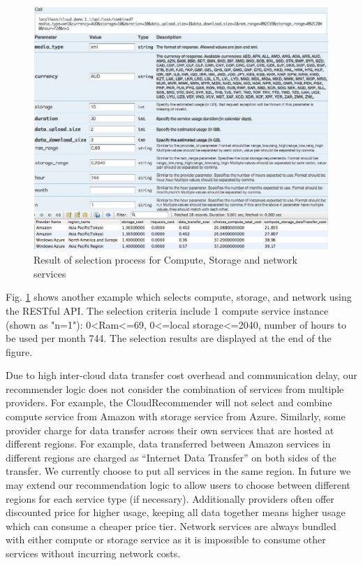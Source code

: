 \begin{figure}[!ht]
  \includegraphics[width=\textwidth,keepaspectratio]{Figures/system/CloudRecommender/ResultOfSelectionForComputeStorageNetwork.jpg}
  \caption{Result of selection process for Compute, Storage and network services}
  \label{fig:ResultOfSelectionForComputeStorageNetwork}
\end{figure}

Fig. \ref{fig:ResultOfSelectionForComputeStorageNetwork} shows another
example which selects compute, storage, and network using the RESTful API. The
selection criteria include 1 compute service instance (shown as "n=1"):
0<Ram<=69, 0<=local storage<=2040, number of hours to be used per month 744.
The selection results are displayed at the end of the figure.

Due to high inter-cloud data transfer cost overhead and communication delay, our
recommender logic does not consider the combination of services from multiple
providers. For example, the CloudRecommender will not select and combine compute
service from Amazon with storage service from Azure. 
Similarly, some provider charge for data transfer across their
own services that are hosted at different regions. For example, data transferred
between Amazon services in different regions are charged as “Internet Data Transfer”
on both sides of the transfer. We currently choose to put all services in the same
region. In future we may extend our recommendation logic to allow users to choose
between different regions for each service type (if necessary). Additionally providers
often offer discounted price for higher usage, keeping all data together means higher
usage which can consume a cheaper price tier. Network services are always bundled
with either compute or storage service as it is impossible to consume other services
without incurring network costs.

